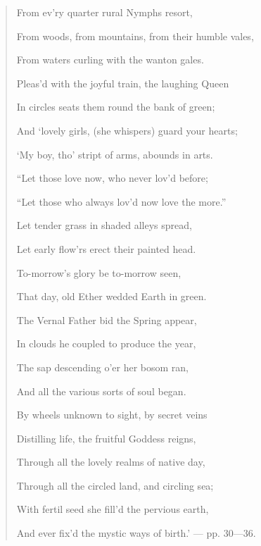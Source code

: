 \documentclass[a4paper, 11pt, oneside, polutonikogreek, english]{article}
\begin{document}
\begin{quotation}
From ev'ry quarter rural Nymphs resort,

From woods, from mountains, from their humble vales,

From waters curling with the wanton gales.

Pleas'd with the joyful train, the laughing Queen

In circles seats them round the bank of green;

And `lovely girls, (she whispers) guard your hearts;

`My boy, tho' stript of arms, abounds in arts.

\hspace*{15mm}``Let those love now, who never lov'd before;

``Let those who always lov'd now love the more.''

\hspace*{15mm}Let tender grass in shaded alleys spread,

Let early flow'rs erect their painted head.

To-morrow's glory be to-morrow seen,

That day, old Ether wedded Earth in green.

The Vernal Father bid the Spring appear,

In clouds he coupled to produce the year,

The sap descending o'er her bosom ran,

And all the various sorts of soul began.

By wheels unknown to sight, by secret veins

Distilling life, the fruitful Goddess reigns,

Through all the lovely realms of native day,

Through all the circled land, and circling sea;

With fertil seed she fill'd the pervious earth,

And ever fix'd the mystic ways of birth.' --- pp. 30—36.
\end{quotation}
\end{document}
